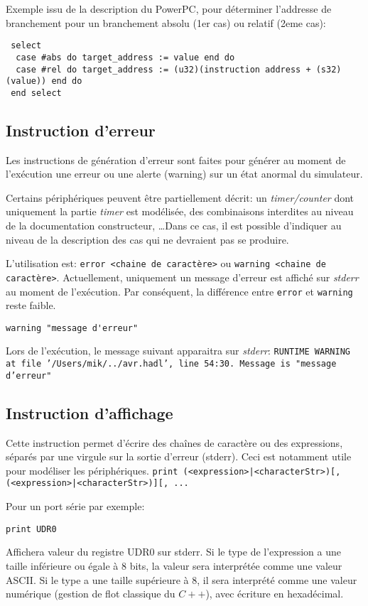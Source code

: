 Exemple issu de la description du PowerPC, pour déterminer l'addresse de branchement pour un branchement absolu (1er cas) ou relatif (2eme cas):
\begin{lstlisting}
 select
  case #abs do target_address := value end do
  case #rel do target_address := (u32)(instruction address + (s32)(value)) end do
 end select
\end{lstlisting}


\subsection{Instruction d'erreur}
\label{sec:instError}
Les instructions de génération d'erreur sont faites pour générer au moment de l'exécution une erreur ou une alerte (warning) sur un état anormal du simulateur. 

Certains périphériques peuvent être partiellement décrit: un \emph{timer/counter} dont uniquement la partie \emph{timer} est modélisée, des combinaisons interdites au niveau de la documentation constructeur, \ldots Dans ce cas, il est possible d'indiquer au niveau de la description des cas qui ne devraient pas se produire. 

L'utilisation est: \texttt{error <chaine de caractère>} ou \texttt{warning <chaine de caractère>}. Actuellement, uniquement un message d'erreur est affiché sur \emph{stderr} au moment de l'exécution. Par conséquent, la différence entre \texttt{error} et \texttt{warning} reste faible.

\begin{lstlisting}
warning "message d'erreur"
\end{lstlisting}

Lors de l'exécution, le message suivant apparaitra sur \emph{stderr}: \texttt{RUNTIME WARNING at file '/Users/mik/../avr.hadl', line 54:30. Message is "message d'erreur"}

\subsection{Instruction d'affichage}
Cette instruction permet d'écrire des chaînes de caractère ou des expressions, séparés par une virgule sur la sortie d'erreur (stderr). Ceci est notamment utile pour modéliser les périphériques.
\texttt{print (<expression>|<characterStr>)[,(<expression>|<characterStr>)][, ...} 

Pour un port série par exemple: 
\begin{lstlisting}
print UDR0
\end{lstlisting}
Affichera valeur du registre UDR0 sur stderr. Si le type de l'expression a une taille inférieure ou égale à 8 bits, la valeur sera interprétée comme une valeur ASCII. Si le type a une taille supérieure à 8, il sera interprété comme une valeur numérique (gestion de flot classique du $C++$), avec écriture en hexadécimal.

